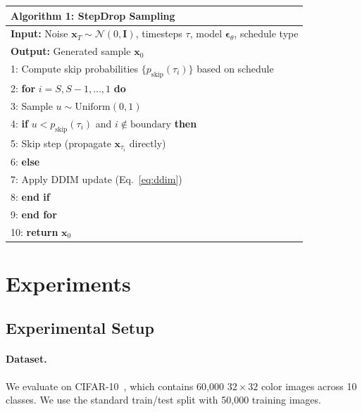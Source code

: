 \documentclass{article}
\begin{document}
\begin{table}[h]
\centering
\small
\begin{tabular}{l}
\toprule
\textbf{Algorithm 1:} StepDrop Sampling \\
\midrule
\textbf{Input:} Noise $\mathbf{x}_T \sim \mathcal{N}(0, \mathbf{I})$, timesteps $\tau$, model $\boldsymbol{\epsilon}_\theta$, schedule type \\
\textbf{Output:} Generated sample $\mathbf{x}_0$ \\
\midrule
1: Compute skip probabilities $\{p_{\text{skip}}(\tau_i)\}$ based on schedule \\
2: \textbf{for} $i = S, S-1, \ldots, 1$ \textbf{do} \\
3: \quad Sample $u \sim \text{Uniform}(0, 1)$ \\
4: \quad \textbf{if} $u < p_{\text{skip}}(\tau_i)$ and $i \notin \text{boundary}$ \textbf{then} \\
5: \quad \quad Skip step (propagate $\mathbf{x}_{\tau_i}$ directly) \\
6: \quad \textbf{else} \\
7: \quad \quad Apply DDIM update (Eq.~\ref{eq:ddim}) \\
8: \quad \textbf{end if} \\
9: \textbf{end for} \\
10: \textbf{return} $\mathbf{x}_0$ \\
\bottomrule
\end{tabular}
\label{alg:stepdrop}
\end{table}

\section{Experiments}
\label{sec:experiments}

\subsection{Experimental Setup}

\paragraph{Dataset.} We evaluate on CIFAR-10~\citep{krizhevsky2009learning}, which contains 60,000 $32 \times 32$ color images across 10 classes. We use the standard train/test split with 50,000 training images.
\end{document}
